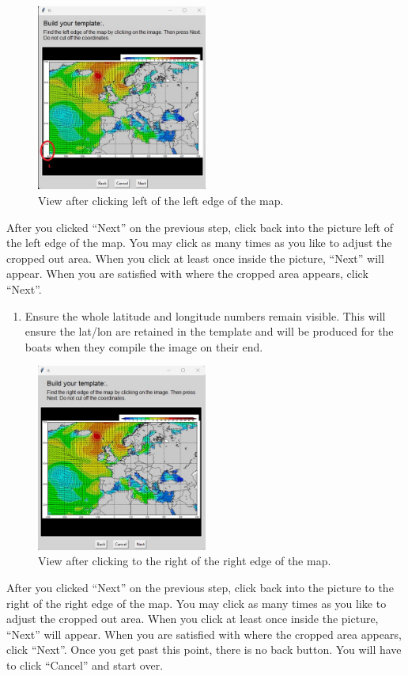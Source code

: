 \newpage
\begin{figure}[H]
    \centering\includegraphics[width=0.5\textwidth]{TeX/Build_Template6.jpg}
    \caption{View after clicking left of the left edge of the map.}
\end{figure}
After you clicked ``Next'' on the previous step, click back into the picture left of the left edge of the map. You may click as many times as you like to adjust the cropped out area. When you click at least once inside the picture, ``Next'' will appear. When you  are satisfied with where the cropped area appears, click ``Next''.
\begin{enumerate}
    \item Ensure the whole latitude and longitude numbers remain visible.  This will ensure the lat/lon are retained in the template and will be produced for the boats when they compile the image on their end.
\end{enumerate}

\newpage
\begin{figure}[H]
    \centering\includegraphics[width=0.5\textwidth]{TeX/Build_Template7.jpg}
    \caption{View after clicking to the right of the right edge of the map.}
\end{figure}
After you clicked ``Next'' on the previous step, click back into the picture to the right of the right edge of the map. You may click as many times as you like to adjust the cropped out area. When you click at least once inside the picture, ``Next'' will appear. When you  are satisfied with where the cropped area appears, click ``Next''. Once you get past this point, there is no back button.  You will have to click ``Cancel'' and start over.

